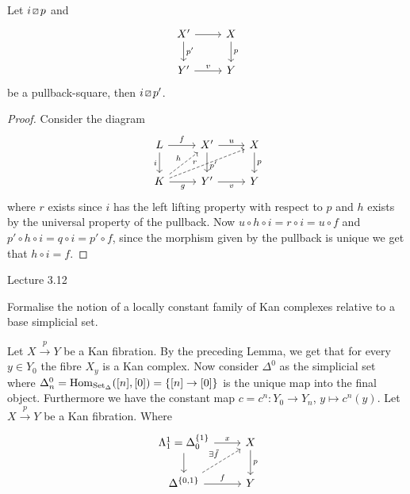 \begin{lem}
    Let $i \lift{} p$ and
    \[
    \begin{tikzcd}
        X'
        \arrow[d,"p'"]
        \ar[r]
        &
        X
        \ar[d,"p"]
        \\
        Y'
        \ar[r,"v"]
        &
        Y    
    \end{tikzcd}
    \]
    be a pullback-square, then $i \lift{} p'$.
\end{lem}

\begin{proof}
    Consider the diagram
    \[
    \begin{tikzcd}
        L
        \ar[r,"f"]
        \ar[d,"i"']
        &
        X'
        \arrow[d,"p'" pos=0.65]
        \ar[r, "u"]
        &
        X
        \ar[d,"p"]
        \\
        K
        \arrow[r,"g"']
        \ar[rru, dashed, "r" pos= 0.4]
        \ar[ru, dashed, "h"]
        &
        Y'
        \ar[r,"v"']
        &
        Y    
    \end{tikzcd}
    \]
    where $r$ exists since $i$ has the left lifting property with respect to $p$ and $h$ exists by the universal property of the pullback.
    Now $u \circ h \circ i = r \circ i = u \circ f$ and $p' \circ h \circ i = q \circ i = p' \circ f$, since the  morphism given by the pullback is unique we get that $h \circ i = f$.
\end{proof}

Lecture 3.12 

Formalise the notion of a locally constant family of Kan complexes relative to a base simplicial set.

\begin{defi}
    Let $X \xrightarrow{p} Y$ be a Kan fibration. 
    By the preceding Lemma, we get that for every $y\in Y_0$ the fibre $X_y$ is a Kan complex. 
    Now consider $\Delta^0$ as the simplicial set where $\Delta^0_n=\operatorname{Hom}_{\operatorname{Set}_{\Delta}}([n],[0])=\{[n] \to [0]\}$ is the unique map into the final object.
    Furthermore we have the constant map $c=c^n\colon Y_0 \to  Y_n$, $y \mapsto c^n(y)$.
    Let $X \xrightarrow{p} Y$ be a Kan fibration.
    Where 
    \[
    \begin{tikzcd}
        \Lambda_1^1=\Delta^{\{1\}}_0
        \ar[r,"x"]
        \ar[d]
        &
        X
        \ar[d,"p"]
        \\
        \Delta^{\{0,1\}}
        \ar[r,"f"]
        \ar[ru, dashed, "\exists \Tilde{f}"]
        &
        Y
    \end{tikzcd}
    \]
\end{defi}


